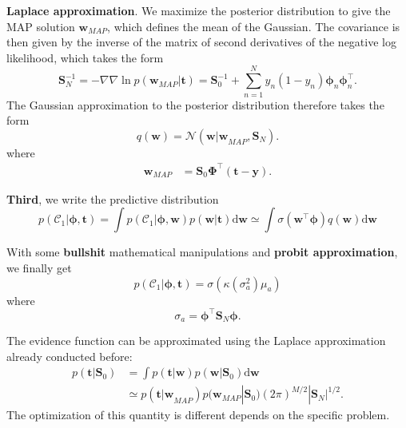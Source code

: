 \documentclass[a4paper]{report}
\newcommand{\ud}{\mathrm{d}}
\renewcommand{\bf}{\mathbf}
\renewcommand{\cal}{\mathcal}
\newcommand{\bs}{\boldsymbol}
\begin{document}
\textbf{Laplace approximation}. We maximize the posterior distribution to give the MAP solution $\bf{w}_{MAP}$, which defines the mean of the Gaussian. The covariance is then given by the inverse of the matrix of second derivatives of the negative log likelihood, which takes the form
\begin{equation}
	\bf{S}_N^{-1} = - \nabla\nabla \ln p(\bf{w}_{MAP}|\bf{t}) = \bf{S}_0^{-1} + \sum_{n=1}^N y_n(1-y_n)\bs{\phi}_n \bs{\phi}_n^{\intercal}.
\end{equation}
The Gaussian approximation to the posterior distribution therefore takes the form
\begin{equation}
	q(\bf{w}) = \cal{N}(\bf{w|w}_{MAP},\bf{S}_N).
\end{equation}
where
\begin{align}
	\bf{w}_{MAP} &=  \bf{S}_0 \bs{\Phi}^{\intercal} (\bf{t-y}).
\end{align}

\textbf{Third}, we write the predictive distribution
\begin{equation}
	p(\cal{C}_1|\bs{\phi},\bf{t})=\int p(\cal{C}_1|\bs{\phi},\bf{w})p(\bf{w|t}) \ud \bf{w} \simeq \int \sigma(\bf{w}^{\intercal}\bs{\phi})q(\bf{w})\ud \bf{w}
\end{equation}

With some \textbf{bullshit} mathematical manipulations and \textbf{probit approximation}, we finally get
\begin{equation}
	p(\cal{C}_1|\bs{\phi},\bf{t}) = \sigma(\kappa(\sigma_a^2)\mu_a)
\end{equation}
where
\begin{equation}
	\sigma_a = \bs{\phi}^{\intercal} \bf{S}_N \bs{\phi}.
\end{equation}

The evidence function can be approximated using the Laplace approximation already conducted before:
\begin{align}
	p(\bf{t}|\bf{S}_0) &= \int p(\bf{t|w})p(\bf{w}|\bf{S}_0) \ud \bf{w} \\
	&\simeq p(\bf{t|w}_{MAP})p(\bf{w}_{MAP}|\bf{S}_0)(2\pi)^{M/2}|\bf{S}_N|^{1/2}. \label{LCEvi}
\end{align}
The optimization of this quantity is different depends on the specific problem.
\end{document}
